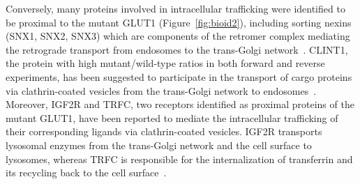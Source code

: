 Conversely, many proteins involved in intracellular trafficking were identified to be proximal to the mutant GLUT1 (Figure~\ref{fig:bioid2}), including sorting nexins (SNX1, SNX2, SNX3) which are components of the retromer complex mediating the retrograde transport from endosomes to the trans-Golgi network~\cite{Rojas,Carlton,Mari,Harterink}. CLINT1, the protein with high mutant/wild-type ratios in both forward and reverse experiments, has been suggested to participate in the transport of cargo proteins via clathrin-coated vesicles from the trans-Golgi network to endosomes~\cite{Mills,Kalthoff,Hirst}. Moreover, IGF2R and TRFC, two receptors identified as proximal proteins of the mutant GLUT1, have been reported to mediate the intracellular trafficking of their corresponding ligands via clathrin-coated vesicles. IGF2R transports lysosomal enzymes from the trans-Golgi network and the cell surface to lysosomes, whereas TRFC is responsible for the internalization of transferrin and its recycling back to the cell surface~\cite{Byrd,Daro}. 

